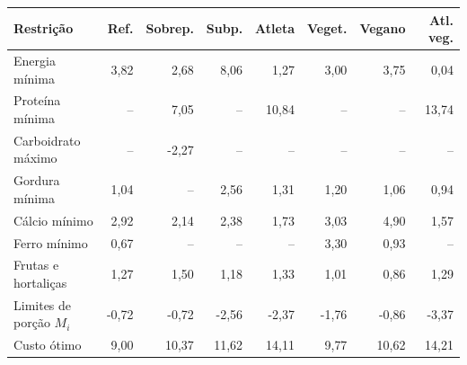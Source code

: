 \begin{tabular}{lrrrrrrr}
\toprule
Restrição & Ref. & Sobrep. & Subp. & Atleta & Veget. & Vegano & Atl. veg. \\
\midrule
Energia mínima & 3{,}82 & 2{,}68 & 8{,}06 & 1{,}27 & 3{,}00 & 3{,}75 & 0{,}04 \\
Proteína mínima & -- & 7{,}05 & -- & 10{,}84 & -- & -- & 13{,}74 \\
Carboidrato máximo & -- & -2{,}27 & -- & -- & -- & -- & -- \\
Gordura mínima & 1{,}04 & -- & 2{,}56 & 1{,}31 & 1{,}20 & 1{,}06 & 0{,}94 \\
Cálcio mínimo & 2{,}92 & 2{,}14 & 2{,}38 & 1{,}73 & 3{,}03 & 4{,}90 & 1{,}57 \\
Ferro mínimo & 0{,}67 & -- & -- & -- & 3{,}30 & 0{,}93 & -- \\
Frutas e hortaliças & 1{,}27 & 1{,}50 & 1{,}18 & 1{,}33 & 1{,}01 & 0{,}86 & 1{,}29 \\
Limites de porção $M_i$ & -0{,}72 & -0{,}72 & -2{,}56 & -2{,}37 & -1{,}76 & -0{,}86 & -3{,}37 \\
\midrule
Custo ótimo & 9{,}00 & 10{,}37 & 11{,}62 & 14{,}11 & 9{,}77 & 10{,}62 & 14{,}21 \\
\bottomrule
\end{tabular}
